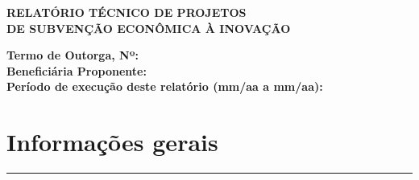 \documentclass[a4paper,12pt]{article}
\begin{document}
	
    \thispagestyle{empty}
\thisfancypage{\setlength{\fboxsep}{15pt}\doublebox}{}

\vspace*{8cm} 

\noindent
{}

\vspace{5cm}

\begin{center}
    \Large\textbf{RELATÓRIO TÉCNICO DE PROJETOS \\ DE SUBVENÇÃO ECONÔMICA À INOVAÇÃO}
\end{center}

\vspace{1cm}

\textbf{Termo de Outorga, Nº:} \\

\textbf{Beneficiária Proponente:} \\

\textbf{Período de execução deste relatório \fontsize{8}{10}\selectfont(mm/aa a mm/aa):}

\newpage  
\thispagestyle{empty}

     
    \tableofcontents  %

\restoregeometry	
\newpage
	
\section{Informações gerais}
\vspace{-0.8cm} %
\noindent %
\rule{\textwidth}{2pt} %
\end{document}
